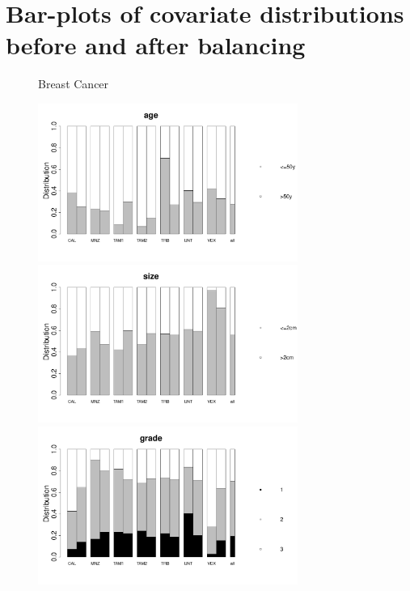 \documentclass{article}
\begin{document}
\newpage
\section{Bar-plots of covariate distributions before and after balancing}
\begin{figure}[H]
\centerline{Breast Cancer}
      \centering
        \begin{minipage}[b]{0.5\textwidth}
            \includegraphics[width=8.5cm]{barplot_age.pdf}
        \end{minipage}%
        \begin{minipage}[b]{0.5\textwidth}
            \includegraphics[width=8.5cm]{barplot_size.pdf}
        \end{minipage}
        \begin{minipage}[b]{0.5\textwidth}
            \includegraphics[width=8.5cm]{barplot_grade.pdf}
        \end{minipage}
    \label{barplots}
  \end{figure}
\end{document}
